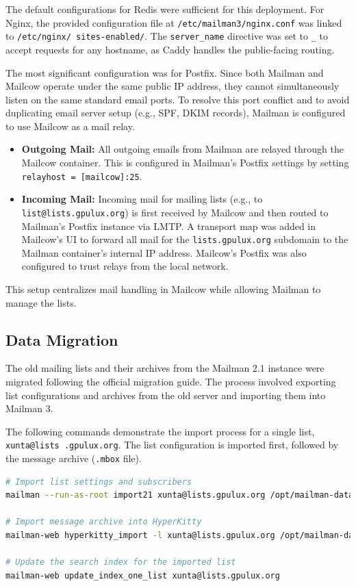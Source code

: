 The default configurations for Redis were sufficient for this deployment. For Nginx, the provided configuration file at \texttt{/etc/mailman3/nginx.conf} was linked to \texttt{/etc/nginx/ sites-enabled/}. The \texttt{server\_name} directive was set to \texttt{\_} to accept requests for any hostname, as Caddy handles the public-facing routing.

The most significant configuration was for Postfix. Since both Mailman and Mailcow operate under the same public IP address, they cannot simultaneously listen on the same standard email ports. To resolve this port conflict and to avoid duplicating email server setup (e.g., SPF, DKIM records), Mailman is configured to use Mailcow as a mail relay.

\begin{itemize}
    \item \textbf{Outgoing Mail:} All outgoing emails from Mailman are relayed through the Mailcow container. This is configured in Mailman's Postfix settings by setting \texttt{relayhost = [mailcow]:25}.
    \item \textbf{Incoming Mail:} Incoming mail for mailing lists (e.g., to \texttt{list@lists.gpulux.org}) is first received by Mailcow and then routed to Mailman's Postfix instance via LMTP. A transport map was added in Mailcow's UI to forward all mail for the \texttt{lists.gpulux.org} subdomain to the Mailman container's internal IP address. Mailcow's Postfix was also configured to trust relays from the local network.
\end{itemize}

This setup centralizes mail handling in Mailcow while allowing Mailman to manage the lists.

\subsection*{Data Migration}

The old mailing lists and their archives from the Mailman 2.1 instance were migrated following the official migration guide\cite{mailman3-migration}. The process involved exporting list configurations and archives from the old server and importing them into Mailman 3.

The following commands demonstrate the import process for a single list, \texttt{xunta@lists .gpulux.org}. The list configuration is imported first, followed by the message archive (\texttt{.mbox} file).

\begin{lstlisting}[language=bash,caption={Commands to migrate a Mailman 2.1 list to Mailman 3.}]
# Import list settings and subscribers
mailman --run-as-root import21 xunta@lists.gpulux.org /opt/mailman-data/config.pck

# Import message archive into HyperKitty
mailman-web hyperkitty_import -l xunta@lists.gpulux.org /opt/mailman-data/xunta.mbox

# Update the search index for the imported list
mailman-web update_index_one_list xunta@lists.gpulux.org
\end{lstlisting}

